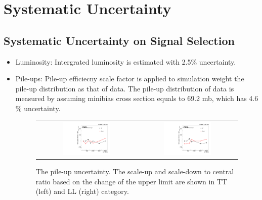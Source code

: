 
\chapter{Systematic Uncertainty} \label{Sysyematic Uncertainty}

\section{Systematic Uncertainty on Signal Selection} \label{Event reconstruction and selection}

\begin{itemize}
  \item Luminosity: Intergrated luminosity is estimated with 2.5$\% $ uncertainty. 
  \item Pile-ups: Pile-up efficiecny scale factor is applied to simulation weight the pile-up distribution as that of data. The pile-up distribution of data is measured by assuming minibias cross section equals to 69.2 mb, which has 4.6$\% $ uncertainty. 
\begin{figure}[t]
  \centering
 \begin{tabular}{cc}
    \includegraphics[width=0.5\textwidth]{Figures/plots_uncert/pu_TT.pdf} &
   \includegraphics[width=0.5\textwidth]{Figures/plots_uncert/pu_LL.pdf} \\
  \end{tabular}
  \caption{The pile-up uncertainty. The scale-up and scale-down to central ratio based on the change of the upper limit are shown in TT (left) and LL (right) category.}
  \label{fig:hvt_brs}
\end{figure}  
   

\end{itemize}

